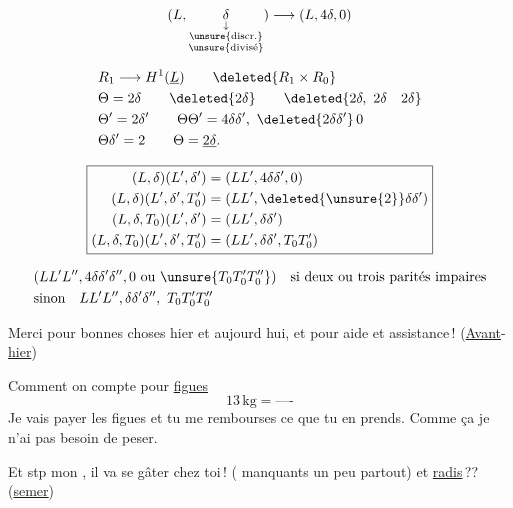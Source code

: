 \[
(L,\underset{\substack{\downarrow\\\text{\unsure{discr.}}\\\text{\unsure{divisé}}}}{\delta})\longrightarrow (L,4\delta,0)
\]

\[
\begin{aligned}
&R_1\longrightarrow H^1(\underline L)\qquad \deleted{R_1\times R_0}\\
&\Theta=2\delta\qquad\deleted{2\delta}\qquad\deleted{2\delta,\ 2\delta\quad 2\delta}\\
&\Theta'=2\delta'\qquad\Theta\Theta'=4\delta\delta',\ \deleted{2\delta\delta'}\,0\\
&\Theta\delta'=2\qquad\Theta=\underline{2\delta}.
\end{aligned}
\]

\[
\boxed{\begin{aligned}
(L,\delta)(L',\delta')&=(LL',4\delta\delta',0)\\
(L,\delta)(L',\delta',T'_0)&=(LL',\deleted{\unsure{2}}\delta\delta')\\
(L,\delta,T_0)(L',\delta')&=(LL',\delta\delta')\\
(L,\delta,T_0)(L',\delta',T'_0)&=(LL',\delta\delta',T_0T'_0)
\end{aligned}}
\]

\[
\begin{aligned}
&(LL'L'',4\delta\delta'\delta'',0\ \text{ou }\unsure{T_0T'_0T''_0})\quad \text{si deux ou trois parités impaires}\\
&\text{sinon}\quad LL'L'',\delta\delta'\delta'',\ T_0T'_0T''_0
\end{aligned}
\]

Merci pour bonnes choses  hier et aujourd hui, et pour aide et assistance\,! (\uline{Avant}-\uline{hier})

Comment on compte pour \uline{figues}
\[13\,\mathrm{kg}=\text{----}\]
Je vais payer les figues et tu me rembourses ce que tu en prends. Comme ça je n'ai pas besoin de peser.

Et  stp mon , il va se gâter chez toi\,!  \uline{} ( manquants un peu partout) et \uline{radis}\,?? (\uline{semer})
